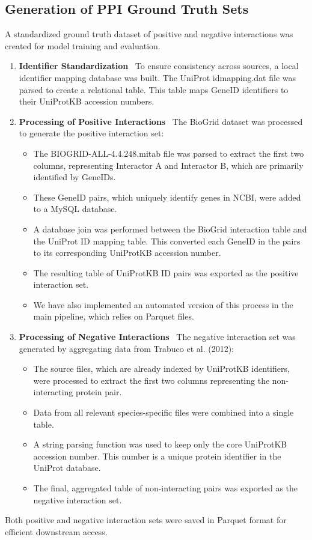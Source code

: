 \documentclass[utf8]{frontiers_suppmat}
\begin{document}
\subsection{Generation of PPI Ground Truth Sets}
A standardized ground truth dataset of positive and negative interactions was created for model training and evaluation.
\begin{enumerate}
	\item \textbf{Identifier Standardization} \ To ensure consistency across sources, a local identifier mapping database was built. The UniProt idmapping.dat file was parsed to create a relational table. This table maps GeneID identifiers to their UniProtKB accession numbers.
	\item \textbf{Processing of Positive Interactions} \ The BioGrid dataset was processed to generate the positive interaction set:
	\begin{itemize}
		\item The BIOGRID-ALL-4.4.248.mitab file was parsed to extract the first two columns, representing Interactor A and Interactor B, which are primarily identified by GeneIDs.
		\item These GeneID pairs, which uniquely identify genes in NCBI, were added to a MySQL database.
		\item A database join was performed between the BioGrid interaction table and the UniProt ID mapping table. This converted each GeneID in the pairs to its corresponding UniProtKB accession number.
		\item The resulting table of UniProtKB ID pairs was exported as the positive interaction set.
		\item We have also implemented an automated version of this process in the main pipeline, which relies on Parquet files.
	\end{itemize}
	\item \textbf{Processing of Negative Interactions} \ The negative interaction set was generated by aggregating data from Trabuco et al. (2012):
	\begin{itemize}
		\item The source files, which are already indexed by UniProtKB identifiers, were processed to extract the first two columns representing the non-interacting protein pair.
		\item Data from all relevant species-specific files were combined into a single table.
		\item A string parsing function was used to keep only the core UniProtKB accession number. This number is a unique protein identifier in the UniProt database.
		\item The final, aggregated table of non-interacting pairs was exported as the negative interaction set.
	\end{itemize}
\end{enumerate}
Both positive and negative interaction sets were saved in Parquet format for efficient downstream access.
\end{document}
